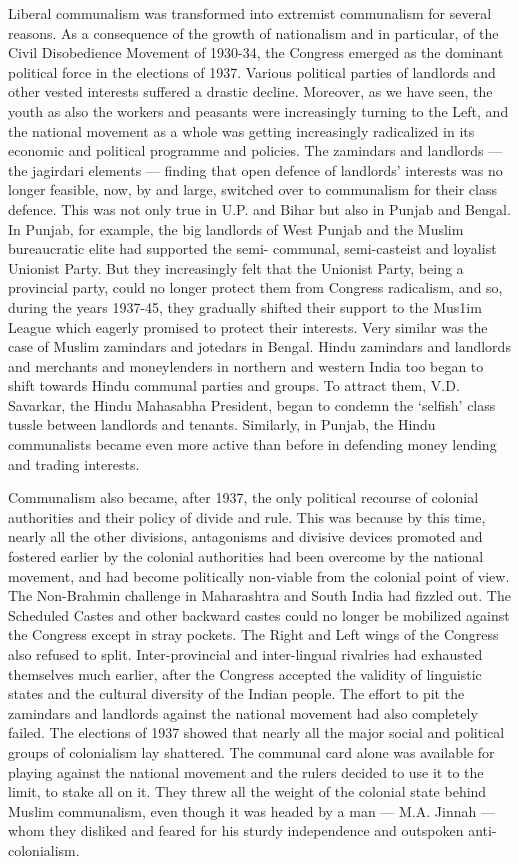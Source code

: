 Liberal communalism was transformed into extremist communalism for several reasons. As a consequence of the growth of nationalism and in particular, of the Civil Disobedience Movement of 1930-34, the Congress emerged as the dominant political force in the elections of 1937. Various political parties of landlords and other vested interests suffered a drastic decline. Moreover, as we have seen, the youth as also the workers and peasants were increasingly turning to the Left, and the national movement as a whole was getting increasingly radicalized in its economic and political programme and policies. The zamindars and landlords — the jagirdari elements — finding that open defence of landlords' interests was no longer feasible, now, by and large, switched over to communalism for their class defence. This was not only true in U.P. and Bihar but also in Punjab and Bengal. In Punjab, for example, the big landlords of West Punjab and the Muslim bureaucratic elite had supported the semi- communal, semi-casteist and loyalist Unionist Party. But they increasingly felt that the Unionist Party, being a provincial party, could no longer protect them from Congress radicalism, and so, during the years 1937-45, they gradually shifted their support to the Mus1im League which eagerly promised to protect their interests. Very similar was the case of Muslim zamindars and jotedars in Bengal. Hindu zamindars and landlords and merchants and moneylenders in northern and western India too began to shift towards Hindu communal parties and groups. To attract them, V.D. Savarkar, the Hindu Mahasabha President, began to condemn the `selfish' class tussle between landlords and tenants. Similarly, in Punjab, the Hindu communalists became even more active than before in defending money lending and trading interests. 

Communalism also became, after 1937, the only political recourse of colonial authorities and their policy of divide and rule. This was because by this time, nearly all the other divisions, antagonisms and divisive devices promoted and fostered earlier by the colonial authorities had been overcome by the national movement, and had become politically non-viable from the colonial point of view. The Non-Brahmin challenge in Maharashtra and South India had fizzled out. The Scheduled Castes and other backward castes could no longer be mobilized against the Congress except in stray pockets. The Right and Left wings of the Congress also refused to split. Inter-provincial and inter-lingual rivalries had exhausted themselves much earlier, after the Congress accepted the validity of linguistic states and the cultural diversity of the Indian people. The effort to pit the zamindars and landlords against the national movement had also completely failed. The elections of 1937 showed that nearly all the major social and political groups of colonialism lay shattered. The communal card alone was available for playing against the national movement and the rulers decided to use it to the limit, to stake all on it. They threw all the weight of the colonial state behind Muslim communalism, even though it was headed by a man — M.A. Jinnah — whom they disliked and feared for his sturdy independence and outspoken anti-colonialism. 

